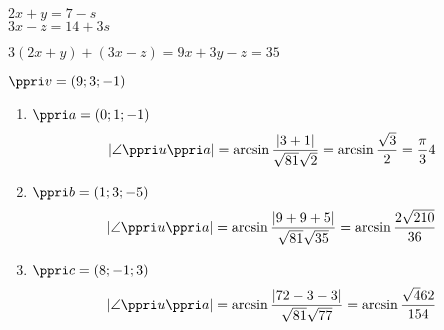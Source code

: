 $2x+y = 7 - s $\\
$3x-z = 14 + 3 s$

$3(2x+y)+(3x-z) = 9x+3y-z = 35$

$\ve v = (9;3;-1)$


\begin{enumerate}
	\item  $ \ve a = (0;1;-1) $
		$$|\angle \ve{u}\ve{a}| = \arcsin \f{|3+1|}{\sqrt{81}\*\sqrt 2} = \arcsin \f{\sqrt 3}{2} = \f\pi34$$
	\item  $ \ve b = (1;3;-5) $
		$$|\angle \ve{u}\ve{a}| = \arcsin \f{|9+9+5|}{\sqrt{81}\*\sqrt{35}} = \arcsin \f{2\sqrt{210}}{36}$$

	\item  $ \ve c = (8;-1;3) $
		$$|\angle \ve{u}\ve{a}| = \arcsin \f{|72-3-3|}{\sqrt{81}\*\sqrt{77}} = \arcsin \f{\sqrt 462}{154}$$

\end{enumerate}




\EndDoc
